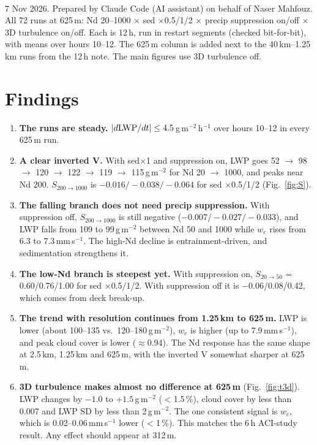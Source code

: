 \documentclass[10pt]{article}
\begin{document}
\sloppy
{}\\[2pt]
7 Nov 2026. Prepared by Claude Code (AI assistant) on behalf of Naser Mahfouz.
All 72 runs at 625\,m: Nd 20--1000 $\times$ sed $\times$0.5/1/2 $\times$ precip suppression on/off $\times$ 3D turbulence on/off.
Each is 12\,h, run in restart segments (checked bit-for-bit), with means over hours 10--12.
The 625\,m column is added next to the 40\,km--1.25\,km runs from the 12\,h note. The main figures use 3D turbulence off.

\section*{Findings}
\begin{enumerate}
\item \textbf{The runs are steady.} $|d{\rm LWP}/dt| \le 4.5$\,g\,m$^{-2}$\,h$^{-1}$ over hours 10--12 in every 625\,m run.
\item \textbf{A clear inverted V.} With sed$\times$1 and suppression on, LWP goes 52 $\to$ 98 $\to$ 120 $\to$ 122 $\to$ 119 $\to$ 115\,g\,m$^{-2}$ for Nd 20 $\to$ 1000,
and peaks near Nd 200. $S_{200\to1000}$ is $-0.016/-0.038/-0.064$ for sed $\times$0.5/1/2 (Fig.~\ref{fig:S}).
\item \textbf{The falling branch does not need precip suppression.} With suppression off, $S_{200\to1000}$ is still negative ($-0.007/-0.027/-0.033$), and LWP falls from 109 to 99\,g\,m$^{-2}$
between Nd 50 and 1000 while $w_e$ rises from 6.3 to 7.3\,mm\,s$^{-1}$. The high-Nd decline is entrainment-driven, and sedimentation strengthens it.
\item \textbf{The low-Nd branch is steepest yet.} With suppression on, $S_{20\to50}$ = 0.60/0.76/1.00 for sed $\times$0.5/1/2. With suppression off it is $-0.06$/0.08/0.42, which comes from deck break-up.
\item \textbf{The trend with resolution continues from 1.25\,km to 625\,m.} LWP is lower (about 100--135 vs.\ 120--180\,g\,m$^{-2}$), $w_e$ is higher (up to 7.9\,mm\,s$^{-1}$), and peak cloud cover
is lower ($\approx$0.94). The Nd response has the same shape at 2.5\,km, 1.25\,km and 625\,m, with the inverted V somewhat sharper at 625\,m.
\item \textbf{3D turbulence makes almost no difference at 625\,m} (Fig.~\ref{fig:t3d}). LWP changes by $-1.0$ to $+1.5$\,g\,m$^{-2}$ ($<$1.5\,\%), cloud cover by less than 0.007 and LWP SD by less than 2\,g\,m$^{-2}$.
The one consistent signal is $w_e$, which is 0.02--0.06\,mm\,s$^{-1}$ lower ($<$1\,\%). This matches the 6\,h ACI-study result. Any effect should appear at 312\,m.
\end{enumerate}
\end{document}
